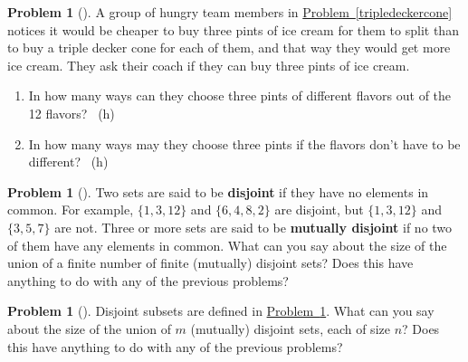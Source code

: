 \documentclass[10pt,]{book}
\newcommand{\terminology}[1]{\textbf{#1}}
\theoremstyle{plain}
\theoremstyle{definition}
\newtheorem{activity}[project]{Problem}
\theoremstyle{definition}
\numberwithin{equation}{chapter}
\begin{document}
\begin{activity}[] \label{icecreaminpints}
\hypertarget{p-66}{}%
A group of hungry team members in \hyperref[tripledeckercone]{Problem~\ref{tripledeckercone}} notices it would be cheaper to buy three pints of ice cream for them to split than to buy a triple decker cone for each of them, and that way they would get more ice cream. They ask their coach if they can buy three pints of ice cream.%
\begin{enumerate}[font=\bfseries,label=(\alph*),ref=\alph*]
\item\label{task-11} \marginsymbol[-2.5em]{} \hypertarget{p-67}{}%
In how many ways can they choose three pints of different flavors out of the 12 flavors?%
~{\tiny (h)}\item\label{task-12} \marginsymbol[-2.5em]{} \hypertarget{p-70}{}%
In how many ways may they choose three pints if the flavors don't have to be different?%
~{\tiny (h)}\end{enumerate}
\end{activity}
\begin{activity}[] \label{sum}
\hypertarget{p-73}{}%
Two sets are said to be \terminology{disjoint} if they have no elements in common. For example, \(\{1,3,12\}\) and \(\{6, 4, 8, 2\}\) are disjoint, but \(\{1,3,12\}\) and \(\{3,5,7\}\) are not. Three or more sets are said to be \terminology{mutually disjoint} if no two of them have any elements in common. What can you say about the size of the union of a finite number of finite (mutually) disjoint sets? Does this have anything to do with any of the previous problems?%
\end{activity}
\begin{activity}[] \label{product}
\hypertarget{p-75}{}%
Disjoint subsets are defined in \hyperref[sum]{Problem~\ref{sum}}. What can you say about the size of the union of \(m\) (mutually) disjoint sets, each of size \(n\)? Does this have anything to do with any of the previous problems?%
\end{activity}
\typeout{************************************************}
\typeout{************************************************}
\end{document}
